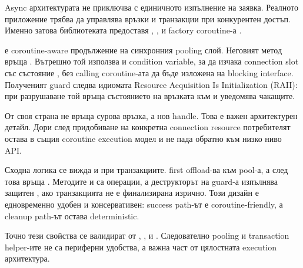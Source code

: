 Async архитектурата не приключва с единичното изпълнение на заявка. Реалното приложение трябва да управлява връзки и транзакции при конкурентен достъп. Именно затова библиотеката предоставя , ,  и factory coroutine-а .

 е coroutine-aware продължение на синхронния pooling слой. Неговият  метод връща . Вътрешно той използва  и condition variable, за да изчака connection slot със състояние , без calling coroutine-ата да бъде изложена на blocking interface. Полученият guard следва идиомата Resource Acquisition Is Initialization (RAII): при разрушаване той връща състоянието на връзката към  и уведомява чакащите.

От своя страна  не връща сурова връзка, а нов  handle. Това е важен архитектурен детайл. Дори след придобиване на конкретна connection resource потребителят остава в същия coroutine execution модел и не пада обратно към низко ниво API.

Сходна логика се вижда и при транзакциите.  first offload-ва  към pool-а, а след това връща . Методите  и  са  операции, а деструкторът на guard-а изпълнява защитен , ако транзакцията не е финализирана изрично. Този дизайн е едновременно удобен и консервативен: success path-ът е coroutine-friendly, а cleanup path-ът остава deterministic.

Точно тези свойства се валидират от , ,  и . Следователно pooling и transaction helper-ите не са периферни удобства, а важна част от цялостната execution архитектура.

